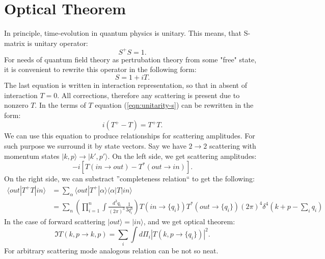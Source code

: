 \documentclass[12pt]{revtex4-1}
\begin{document}
\section{Optical Theorem}
	In principle, time-evolution in quantum physics is unitary. This means, that S-matrix
	is unitary operator:
	\begin{equation}\label{eqn:unitarity-s}
		S^+ S = 1.
	\end{equation}
	For needs of quantum field theory as pertrubation theory from some "free" state,
	it is convenient to rewrite this operator in the following form:
	\begin{equation}
		S = 1 + i T.
	\end{equation}
	The last equation is written in interaction representation, so that in absent of
	interaction $T = 0$. All corrections, therefore any scattering is present
	due to nonzero $T$. In the terms of $T$ equation (\ref{eqn:unitarity-s}) can be
	rewritten in the form:
	\begin{equation}\label{eqn:unitarity-t}
		i (T^+ - T) =  T^+ T.
	\end{equation}
	We can use this equation to produce relationships for scattering amplitudes.
	For such purpose we surround it by state vectors. Say we have $2 \to 2$ scattering
	with momentum states $| k, p \rangle \to | k', p' \rangle$. On the left side,
	we get scattering amplitudes:
	\begin{equation} \label{eqn:pre-imaginary}
		-i[ T(in \to out) - T^\ast(out \to in)].
	\end{equation}
	On the right side, we can substract ''completeness relation`` to get the following:
	\begin{align}
		 \langle out | T^+ T | in \rangle & =
		 \sum_{\alpha}  \langle out | T^+| \alpha \rangle \langle \alpha |T | in \rangle 
		 \nonumber
		 \\
		 & = \sum_n \left(\prod_{i=1}^n \int \frac{d^3 q_i}{(2 \pi)^3} \frac{1}{3 q^0_i}
		 \right) T(in \to \{q_i\}) T^*(out \to \{q_i\}) (2 \pi)^4
		 \delta^4(k + p - \sum_i q_i)
	\end{align}
	In the case of forward scattering $| out \rangle = | in \rangle$, and we get
	optical theorem:
	\begin{equation}
		\Im T(k,p \to k,p) = \sum_i \int d\Pi_i | T(k,p \to \{q_i\}) |^2.
	\end{equation}
	For arbitrary scattering mode analogous relation can be not so neat.
	
\end{document}
